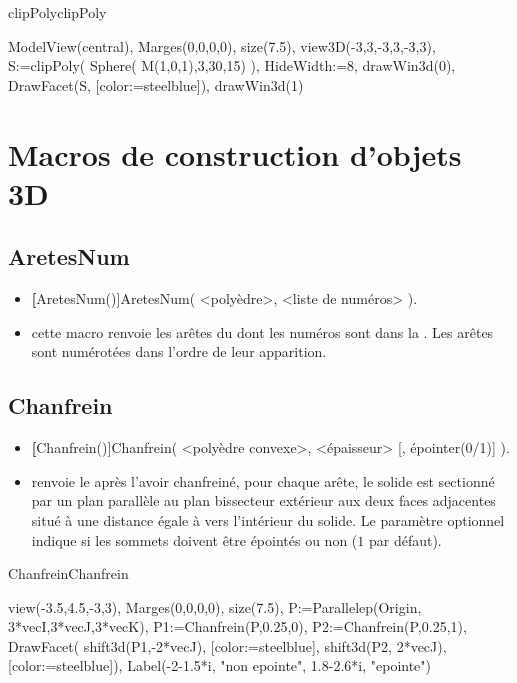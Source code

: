 \begin{demo}{clipPoly}{clipPoly}
\begin{texgraph}[name=clipPoly]
 ModelView(central), Marges(0,0,0,0), size(7.5),
 view3D(-3,3,-3,3,-3,3),
 S:=clipPoly( Sphere( M(1,0,1),3,30,15) ),
 HideWidth:=8, drawWin3d(0), 
 DrawFacet(S, [color:=steelblue]),
 drawWin3d(1)
\end{texgraph}
\end{demo}



\section{Macros de construction d'objets 3D}


\subsection{AretesNum}
\begin{itemize}
 \item \util \textbf[AretesNum()]{AretesNum( <polyèdre>, <liste de numéros> )}.
 \item \desc cette macro renvoie les arêtes du  dont les numéros sont dans la . Les arêtes sont numérotées dans l'ordre de leur apparition.
\end{itemize}


\subsection{Chanfrein}
\begin{itemize}
 \item \util \textbf[Chanfrein()]{Chanfrein( <polyèdre convexe>, <épaisseur> [, épointer(0/1)] )}.
 \item \desc renvoie le  après l'avoir chanfreiné, pour chaque arête, le solide est sectionné par un plan parallèle au plan bissecteur extérieur aux deux faces adjacentes situé à une distance égale à  vers l'intérieur du solide. Le paramètre optionnel  indique si les sommets doivent être épointés ou non ($1$ par défaut).
\end{itemize}

\begin{demo}{Chanfrein}{Chanfrein}
\begin{texgraph}[name=Chanfrein]
 view(-3.5,4.5,-3,3), Marges(0,0,0,0), size(7.5),
 P:=Parallelep(Origin, 3*vecI,3*vecJ,3*vecK),
 P1:=Chanfrein(P,0.25,0), P2:=Chanfrein(P,0.25,1),
 DrawFacet( shift3d(P1,-2*vecJ), [color:=steelblue],
       shift3d(P2, 2*vecJ), [color:=steelblue]),
 Label(-2-1.5*i, "non epointe", 1.8-2.6*i, "epointe")
\end{texgraph}
\end{demo}


